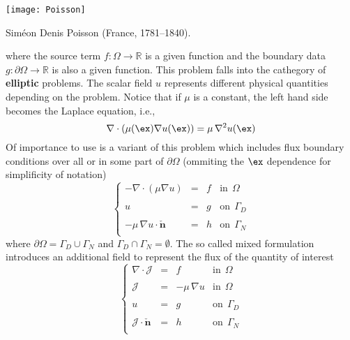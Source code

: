 \begin{marginfigure}[3.0cm]
	\texttt{[image: Poisson]}
	\caption[]{Sim\'eon Denis Poisson (France, 1781--1840).} 
\end{marginfigure}
where the source term $f:\Omega \rightarrow \mathbb{R}$ is a given function and
the boundary data $g:\partial{\Omega} \rightarrow \mathbb{R}$ is also a given
function. This problem falls into the cathegory of \textbf{elliptic} problems. 
The scalar field $u$ represents different physical quantities
depending on the problem. Notice that if $\mu$ is a constant, the left
hand side becomes the Laplace equation, i.e.,
\begin{equation}
\nabla \cdot \left ( \mu(\ex) \nabla{u}(\ex) \right) = \mu \, \nabla^2u(\ex)
\end{equation}
Of importance to use is a variant of this problem which includes flux boundary
conditions over all or in some part of $\partial{\Omega}$ (ommiting the
$\ex$ dependence for simplificity of notation)
\begin{equation}
\left \{
\begin{array}{rcll}
-\nabla \cdot \left ( \mu \nabla{u} \right) & = & f & \mbox{in}~~\Omega \\
& & & \\
u & = & g & \mbox{on}~~\Gamma_D \\
& & & \\
-\mu\,\nabla{u}\cdot \check{\mathbf{n}} & = & h & \mbox{on}~~\Gamma_N \\
\end{array}
\right.
\end{equation}
where $\partial{\Omega} = \Gamma_D \cup \Gamma_N$ and $\Gamma_D \cap \Gamma_N = \emptyset$.
The so called mixed formulation introduces an additional field to represent
the flux of the quantity of interest
\begin{equation}
\left \{
\begin{array}{rcll}
\nabla \cdot \boldsymbol{\mathcal{J}} & = & f & \mbox{in}~~\Omega \\
& & & \\
\boldsymbol{\mathcal{J}} & = & -\mu\,\nabla{u} & \mbox{in}~~\Omega \\
& & & \\
u & = & g & \mbox{on}~~\Gamma_D \\
& & & \\
\boldsymbol{\mathcal{J}} \cdot \check{\mathbf{n}} & = & h & \mbox{on}~~\Gamma_N \\
\end{array}
\right.
\end{equation}
